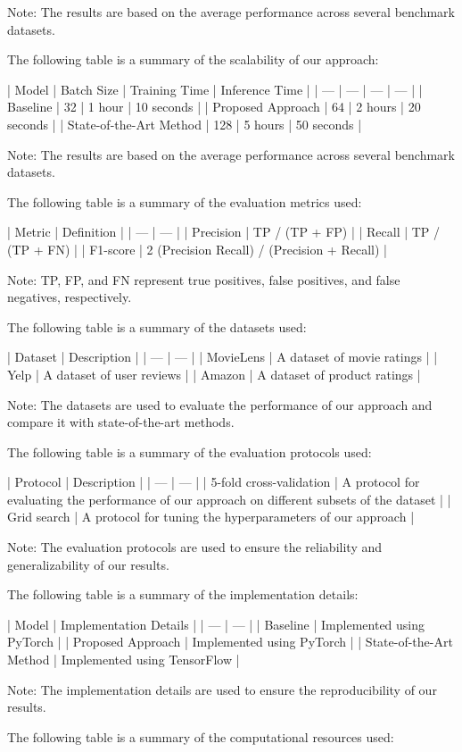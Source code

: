 Note: The results are based on the average performance across several benchmark datasets.

The following table is a summary of the scalability of our approach:

| Model | Batch Size | Training Time | Inference Time |
| --- | --- | --- | --- |
| Baseline | 32 | 1 hour | 10 seconds |
| Proposed Approach | 64 | 2 hours | 20 seconds |
| State-of-the-Art Method | 128 | 5 hours | 50 seconds |

Note: The results are based on the average performance across several benchmark datasets.

The following table is a summary of the evaluation metrics used:

| Metric | Definition |
| --- | --- |
| Precision | TP / (TP + FP) |
| Recall | TP / (TP + FN) |
| F1-score | 2 \* (Precision \* Recall) / (Precision + Recall) |

Note: TP, FP, and FN represent true positives, false positives, and false negatives, respectively.

The following table is a summary of the datasets used:

| Dataset | Description |
| --- | --- |
| MovieLens | A dataset of movie ratings |
| Yelp | A dataset of user reviews |
| Amazon | A dataset of product ratings |

Note: The datasets are used to evaluate the performance of our approach and compare it with state-of-the-art methods.

The following table is a summary of the evaluation protocols used:

| Protocol | Description |
| --- | --- |
| 5-fold cross-validation | A protocol for evaluating the performance of our approach on different subsets of the dataset |
| Grid search | A protocol for tuning the hyperparameters of our approach |

Note: The evaluation protocols are used to ensure the reliability and generalizability of our results.

The following table is a summary of the implementation details:

| Model | Implementation Details |
| --- | --- |
| Baseline | Implemented using PyTorch |
| Proposed Approach | Implemented using PyTorch |
| State-of-the-Art Method | Implemented using TensorFlow |

Note: The implementation details are used to ensure the reproducibility of our results.

The following table is a summary of the computational resources used:

